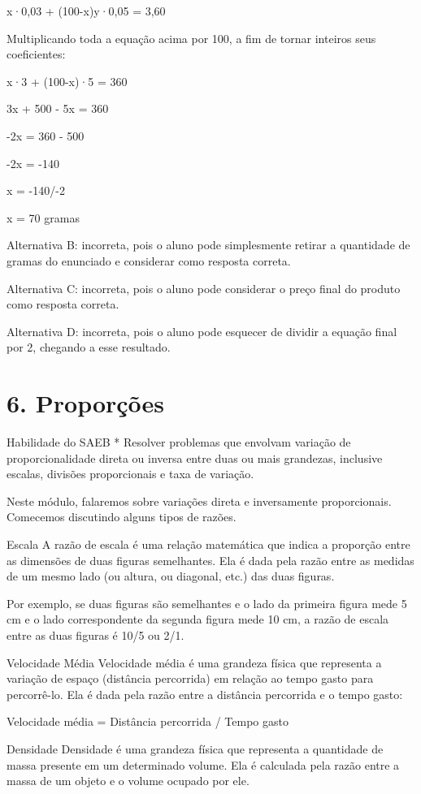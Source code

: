 x·0,03 + (100-x)y·0,05 = 3,60

Multiplicando toda a equação acima por 100, a fim de tornar inteiros
seus coeficientes:

x·3 + (100-x)·5 = 360

3x + 500 - 5x = 360

-2x = 360 - 500

-2x = -140

x = -140/-2

x = 70 gramas

Alternativa B: incorreta, pois o aluno pode simplesmente retirar a
quantidade de gramas do enunciado e considerar como resposta correta.

Alternativa C: incorreta, pois o aluno pode considerar o preço final do
produto como resposta correta.

Alternativa D: incorreta, pois o aluno pode esquecer de dividir a
equação final por 2, chegando a esse resultado.

\chapter{6. Proporções}

Habilidade do SAEB * Resolver problemas que envolvam variação de
proporcionalidade direta ou inversa entre duas ou mais grandezas,
inclusive escalas, divisões proporcionais e taxa de variação.

Neste módulo, falaremos sobre variações direta e inversamente
proporcionais. Comecemos discutindo alguns tipos de razões.

Escala A razão de escala é uma relação matemática que indica a proporção
entre as dimensões de duas figuras semelhantes. Ela é dada pela razão
entre as medidas de um mesmo lado (ou altura, ou diagonal, etc.) das
duas figuras.

Por exemplo, se duas figuras são semelhantes e o lado da primeira figura
mede 5 cm e o lado correspondente da segunda figura mede 10 cm, a razão
de escala entre as duas figuras é 10/5 ou 2/1.

Velocidade Média Velocidade média é uma grandeza física que representa a
variação de espaço (distância percorrida) em relação ao tempo gasto para
percorrê-lo. Ela é dada pela razão entre a distância percorrida e o
tempo gasto:

Velocidade média = Distância percorrida / Tempo gasto

Densidade Densidade é uma grandeza física que representa a quantidade de
massa presente em um determinado volume. Ela é calculada pela razão
entre a massa de um objeto e o volume ocupado por ele.

